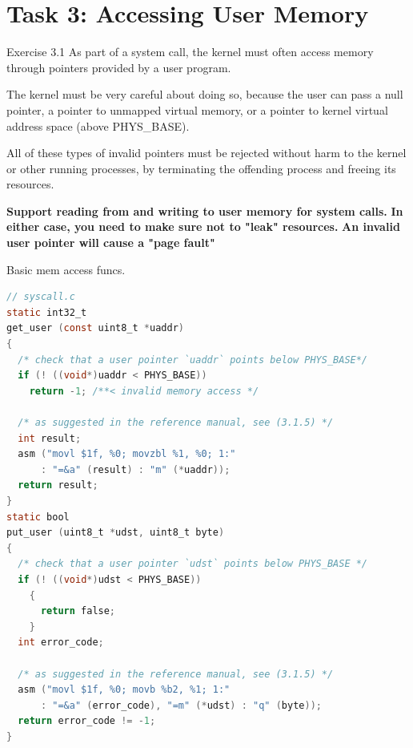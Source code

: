 \documentclass[10pt]{beamer}
\begin{document}
\section{Task 3: Accessing User Memory}
\begin{frame}{Exercise 3.1}
    As part of a system call, the kernel must often access memory through pointers provided by a user program.

The kernel must be very careful about doing so, because the user can pass a null pointer, a pointer to unmapped virtual memory, or a pointer to kernel virtual address space (above PHYS\_BASE).

All of these types of invalid pointers must be rejected without harm to the kernel or other running processes, by terminating the offending process and freeing its resources.

\textbf{Support reading from and writing to user memory for system calls.}
\textbf{In either case, you need to make sure not to "leak" resources.}
\textbf{An invalid user pointer will cause a "page fault"}
\end{frame}
\begin{frame}[fragile]{Basic mem access funcs.}
\begin{lstlisting}[language=C]
// syscall.c
static int32_t
get_user (const uint8_t *uaddr) 
{
  /* check that a user pointer `uaddr` points below PHYS_BASE*/
  if (! ((void*)uaddr < PHYS_BASE))
    return -1; /**< invalid memory access */

  /* as suggested in the reference manual, see (3.1.5) */
  int result;
  asm ("movl $1f, %0; movzbl %1, %0; 1:"
      : "=&a" (result) : "m" (*uaddr));
  return result;
}
static bool
put_user (uint8_t *udst, uint8_t byte) 
{
  /* check that a user pointer `udst` points below PHYS_BASE */
  if (! ((void*)udst < PHYS_BASE)) 
    {
      return false;
    }
  int error_code;

  /* as suggested in the reference manual, see (3.1.5) */
  asm ("movl $1f, %0; movb %b2, %1; 1:"
      : "=&a" (error_code), "=m" (*udst) : "q" (byte));
  return error_code != -1;
}
\end{lstlisting}
\end{frame}
\end{document}

